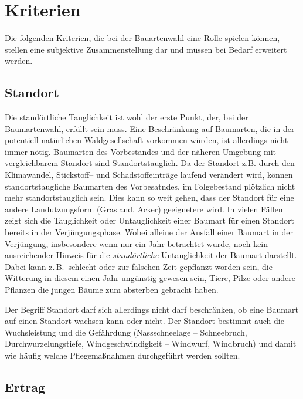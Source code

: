 \documentclass[twocolumn]{scrartcl}
\begin{document}
\section{Kriterien}
\label{sec:kriterien}

Die folgenden Kriterien, die bei der Bauartenwahl eine Rolle spielen
können, stellen eine subjektive Zusammenstellung dar und müssen bei
Bedarf erweitert werden.

\subsection{Standort}
\label{ssec:standort}

Die standörtliche Tauglichkeit ist wohl der erste Punkt, der, bei der
Baumartenwahl, erfüllt sein muss. Eine Beschränkung auf Baumarten, die
in der potentiell natürlichen Waldgesellschaft vorkommen würden, ist
allerdings nicht immer nötig. Baumarten des Vorbestandes und der
näheren Umgebung mit vergleichbarem Standort sind
Standortstauglich. Da der Standort z.B. durch den Klimawandel,
Stickstoff-- und Schadstoffeinträge laufend verändert wird, können
standortstaugliche Baumarten des Vorbesatndes, im Folgebestand
plötzlich nicht mehr standortstauglich sein. Dies kann so weit gehen,
dass der Standort für eine andere Landutzungsform (Grasland, Acker)
geeignetere wird. In vielen Fällen zeigt sich die Tauglichkeit oder
Untauglichkeit einer Baumart für einen Standort bereits in der
Verjüngungsphase. Wobei alleine der Ausfall einer Baumart in der
Verjüngung, insbesondere wenn nur ein Jahr betrachtet wurde, noch kein
ausreichender Hinweis für die \emph{standörtliche} Untauglichkeit der
Baumart darstellt. Dabei kann z.\,B.\ schlecht oder zur falschen Zeit
gepflanzt worden sein, die Witterung in diesem einen Jahr ungünstig
gewesen sein, Tiere, Pilze oder andere Pflanzen die jungen Bäume zum
absterben gebracht haben.

Der Begriff Standort darf sich allerdings nicht darf beschränken, ob
eine Baumart auf einen Standort wachsen kann oder nicht. Der Standort
bestimmt auch die Wuchsleistung und die Gefährdung (Nassschneelage --
Schneebruch, Durchwurzelungstiefe, Windgeschwindigkeit -- Windwurf,
Windbruch) und damit wie häufig welche Pflegemaßnahmen durchgeführt
werden sollten.

\subsection{Ertrag}
\label{ssec:ertrag}
\end{document}
